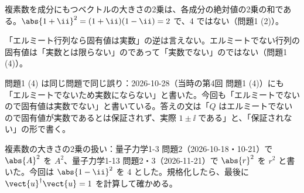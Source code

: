 \documentclass[uplatex,dvipdfmx,a4paper,11pt]{jsarticle}
\begin{document}
\matome
\begin{saitenichiran}
\end{saitenichiran}
\begin{daiji}
  \item 複素数を成分にもつベクトルの大きさの2乗は、各成分の絶対値の2乗の和である。$\abs{1+\ii}^{2}=(1+\ii)(1-\ii)=2$ で、4 ではない（問題1 (2)）。
  \item 「エルミート行列なら固有値は実数」の逆は言えない。エルミートでない行列の固有値は「実数とは限らない」のであって「実数でない」のではない（問題1 (4)）。
\end{daiji}
\begin{maemo}
  \item 問題1 (4) は同じ問題で同じ誤り：2026-10-28（当時の第4回 問題1 (4)）にも「エルミートでないため実数にならない」と書いた。今回も「エルミートでないので固有値は実数でない」と書いている。答えの文は「$Q$ はエルミートでないので固有値が実数であるとは保証されず、実際 $1\pm\ii$ である」と、「保証されない」の形で書く。
  \item 複素数の大きさの2乗の扱い：量子力学1-3 問題2（2026-10-18・10-21）で $\abs{A}^{2}$ を $A^{2}$、量子力学1-13 問題2・3（2026-11-21）で $\abs{r}^{2}$ を $r^{2}$ と書いた。今回は $\abs{1-\ii}^{2}$ を 4 とした。規格化したら、最後に $\vect{u}^{\dagger}\vect{u}=1$ を計算して確かめる。
\end{maemo}
\end{document}
